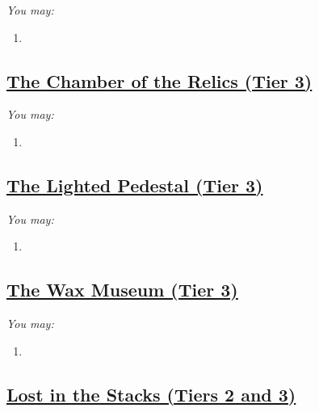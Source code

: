 \documentclass[sheet]{GL2020}
\begin{document}
\begingroup
\itshape
You may:
\begin{enumerate}[A]
  \item 
\end{enumerate}
\endgroup

\clearpage

\begin{center}\section*{\underline{The Chamber of the Relics (Tier 3)}}\end{center}
\label{ChamberofRelics}

\begingroup
\itshape
You may:
\begin{enumerate}[A]
  \item 
\end{enumerate}
\endgroup

\clearpage

\begin{center}\section*{\underline{The Lighted Pedestal (Tier 3)}}\end{center}
\label{LightedPedestal}

\begingroup
\itshape
You may:
\begin{enumerate}[A]
  \item 
\end{enumerate}
\endgroup

\clearpage

\begin{center}\section*{\underline{The Wax Museum (Tier 3)}}\end{center}
\label{WaxMuseum}

\begingroup
\itshape
You may:
\begin{enumerate}[A]
  \item 
\end{enumerate}
\endgroup

\clearpage

\begin{center}\section*{\underline{Lost in the Stacks (Tiers 2 and 3)}}\end{center}
\label{LostintheStacks}
\end{document}
